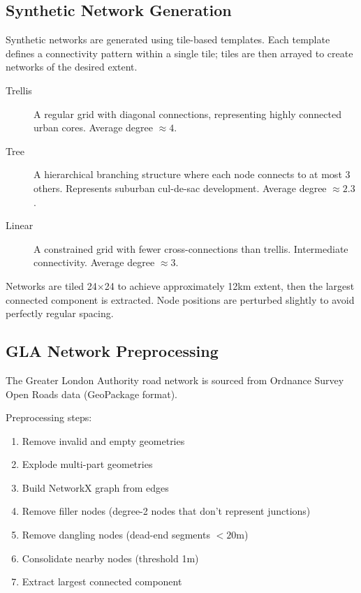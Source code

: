 
\subsection{Synthetic Network Generation}

Synthetic networks are generated using tile-based templates. Each template defines a connectivity pattern within a single tile; tiles are then arrayed to create networks of the desired extent.

\begin{description}
\item[Trellis] A regular grid with diagonal connections, representing highly connected urban cores. Average degree $\approx 4$.

\item[Tree] A hierarchical branching structure where each node connects to at most 3 others. Represents suburban cul-de-sac development. Average degree $\approx 2.3$.

\item[Linear] A constrained grid with fewer cross-connections than trellis. Intermediate connectivity. Average degree $\approx 3$.
\end{description}

Networks are tiled 24$\times$24 to achieve approximately 12km extent, then the largest connected component is extracted. Node positions are perturbed slightly to avoid perfectly regular spacing.

\subsection{GLA Network Preprocessing}

The Greater London Authority road network is sourced from Ordnance Survey Open Roads data (GeoPackage format).

Preprocessing steps:
\begin{enumerate}
\item Remove invalid and empty geometries
\item Explode multi-part geometries
\item Build NetworkX graph from edges
\item Remove filler nodes (degree-2 nodes that don't represent junctions)
\item Remove dangling nodes (dead-end segments $< 20$m)
\item Consolidate nearby nodes (threshold 1m)
\item Extract largest connected component
\end{enumerate}


